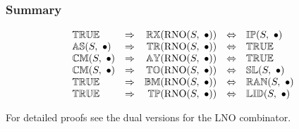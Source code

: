 \documentclass[../Summary.tex]{subfiles}
\begin{document}
\subsubsection{Summary}

\[
\begin{array}{lcrcl} 
{\mathbb{TRUE}}
	& \Rightarrow
	& {\mathbb{RX}}(\mathrm{RNO}(S,\ \bullet)) 
    & \Leftrightarrow
    & {\mathbb{IP}}(S,\ \bullet)  \\
{\mathbb{AS}}(S,\ \bullet)
	& \Rightarrow
	& {\mathbb{TR}}(\mathrm{RNO}(S,\ \bullet))
    & \Leftrightarrow
    & {\mathbb{TRUE}} \\
{\mathbb{CM}}(S,\ \bullet)
	& \Rightarrow
	& {\mathbb{AY}}(\mathrm{RNO}(S,\ \bullet))
    & \Leftrightarrow
    & {\mathbb{TRUE}} \\ 
{\mathbb{CM}}(S,\ \bullet)
	& \Rightarrow
	& {\mathbb{TO}}(\mathrm{RNO}(S,\ \bullet))
    & \Leftrightarrow
    & {\mathbb{SL}}(S,\ \bullet) \\
{\mathbb{TRUE}}
	& \Rightarrow
	& {\mathbb{BM}}(\mathrm{RNO}(S,\ \bullet))
    & \Leftrightarrow
    & {\mathbb{RAN}}(S,\ \bullet) \\ 
{\mathbb{TRUE}}
	& \Rightarrow
	& {\mathbb{TP}}(\mathrm{RNO}(S,\ \bullet))
    & \Leftrightarrow
    & {\mathbb{LID}}(S,\ \bullet) \\ 
\end{array} 
\] 

For detailed proofs see the dual versions for the LNO combinator.
\end{document}
